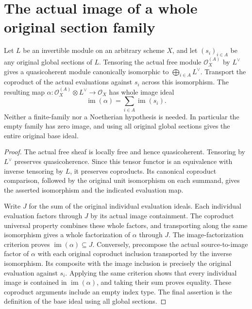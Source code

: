 \section{The actual image of a whole original section family}

\begin{proposition}
\label{prop:actual-invertible-section-family-image}
Let $L$ be an invertible module on an arbitrary scheme $X$, and let
$(s_i)_{i\in A}$ be any original global sections of $L$.
Tensoring the actual free module $\mathcal O_X^{(A)}$ by $L^\vee$
gives a quasicoherent module canonically isomorphic to
$\bigoplus_{i\in A}L^\vee$. Transport the coproduct of the actual
evaluations against $s_i$ across this isomorphism. The resulting map
$\alpha:\mathcal O_X^{(A)}\otimes L^\vee\to\mathcal O_X$ has
whole image ideal
\[
 \operatorname{im}(\alpha)=\sum_{i\in A}\operatorname{im}(s_i).
\]
Neither a finite-family nor a Noetherian hypothesis is needed. In
particular the empty family has zero image, and using all original
global sections gives the entire original base ideal.
\leanok
\end{proposition}
\begin{proof}
The actual free sheaf is locally free and hence quasicoherent.
Tensoring by $L^\vee$ preserves quasicoherence. Since this tensor
functor is an equivalence with inverse tensoring by $L$, it preserves
coproducts. Its canonical coproduct comparison, followed by the
original unit isomorphism on each summand, gives the asserted
isomorphism and the indicated evaluation map.

Write $J$ for the sum of the original individual evaluation ideals.
Each individual evaluation factors through $J$ by its actual image
containment. The coproduct universal property combines these whole
factors, and transporting along the same isomorphism gives a whole
factorization of $\alpha$ through $J$. The image-factorization
criterion proves $\operatorname{im}(\alpha)\subseteq J$.
Conversely, precompose the actual source-to-image factor of $\alpha$
with each original coproduct inclusion transported by the inverse
isomorphism. Its composite with the image inclusion is precisely the
original evaluation against $s_i$. Applying the same criterion shows
that every individual image is contained in
$\operatorname{im}(\alpha)$, and taking their sum proves equality.
These coproduct arguments include an empty index type. The final
assertion is the definition of the base ideal using all global
sections.
\end{proof}

